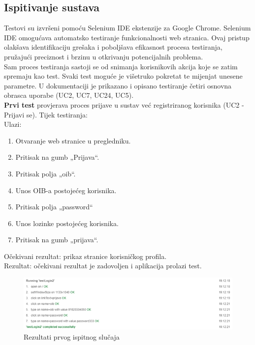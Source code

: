 			\subsection{Ispitivanje sustava}
			
			Testovi su izvršeni pomoću Selenium IDE ekstenzije za Google Chrome. Selenium IDE omogućava automatsko testiranje funkcionalnosti web stranica. Ovaj pristup olakšava identifikaciju grešaka i poboljšava efikasnost procesa testiranja, pružajući preciznost i brzinu u otkrivanju potencijalnih problema.\\ 
				Sam proces testiranja sastoji se od snimanja korisnikovih akcija koje se zatim spremaju kao test. Svaki test moguće je višetruko pokretat te mijenjat unesene parametre. U dokumentaciji je prikazano i opisano testiranje četiri osnovna obrasca uporabe (UC2, UC7, UC24, UC5).\\
			
			\noindent \textbf{Prvi test} provjerava proces prijave u sustav već registriranog korisnika (UC2 - Prijavi se). Tijek testiranja:\\
			Ulazi: 
			\begin{enumerate}
				\item Otvaranje web stranice u pregledniku.
				\item Pritisak na gumb „Prijava“.
				\item Pritisak polja „oib“.
				\item Unos OIB-a postojećeg korisnika.
				\item Pritisak polja „password“
				\item Unos lozinke postojećeg korisnika.
				\item Pritisak na gumb „prijava“.
			\end{enumerate}
			
			\noindent Očekivani rezultat: prikaz stranice korisničkog profila.\\
			Rezultat: očekivani rezultat je zadovoljen i aplikacija prolazi test.
			
			\begin{figure}[H]
				\includegraphics[width=\textwidth]{slike/prijavaUSustav.PNG} %
				\caption{Rezultati prvog ispitnog slučaja}
				\label{fig:prijavaTest} %
			\end{figure}
			\eject 
		
